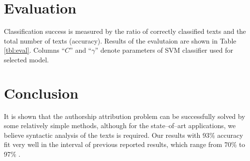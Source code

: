 \documentclass[11pt,english]{article}
\begin{document}
\begin{multicols}{2}
\section{Evaluation}
\label{sec:evaluacija}
Classification success is measured by the ratio of correctly classified texts and
the total number of texts (accuracy). Results of the evalutaion are shown in Table
\ref{tbl:eval}. Columns ``$C$'' and ``$\gamma$'' denote parameters of SVM
classifier used for selected model.


% 
% 

\section{Conclusion}
It is shown that the authorship attribution problem can be successfully solved by
some relatively simple methods, although for the state--of--art applications, we
believe syntactic analysis of the texts is required. Our results with
93\% accuracy fit very well in the interval of previous reported results, which range from
70\% to 97\% \citep{coyotl2006authorship,keselj2003n,luyckx2005shallow,stamatatos2001computer}.


\end{multicols}
\end{document}
